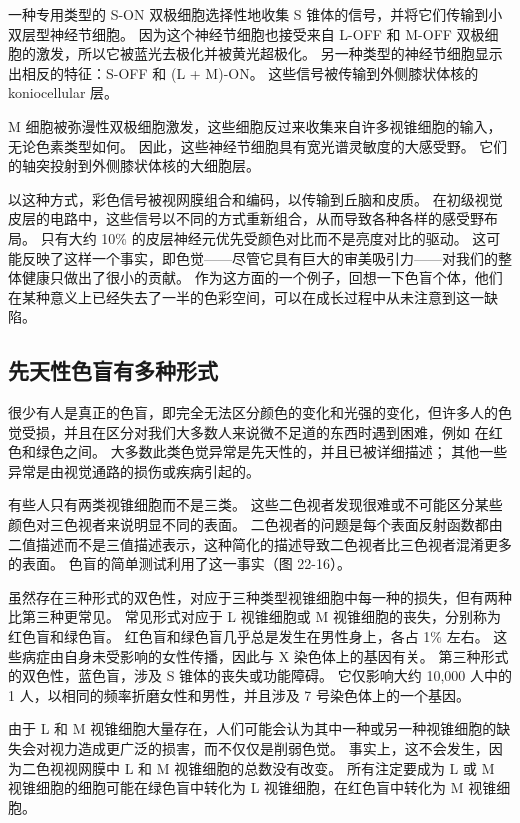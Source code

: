 一种专用类型的 S-ON 双极细胞选择性地收集 S 锥体的信号，并将它们传输到小双层型神经节细胞。 因为这个神经节细胞也接受来自 L-OFF 和 M-OFF 双极细胞的激发，所以它被蓝光去极化并被黄光超极化。 另一种类型的神经节细胞显示出相反的特征：S-OFF 和 (L + M)-ON。 这些信号被传输到外侧膝状体核的 koniocellular 层。

M 细胞被弥漫性双极细胞激发，这些细胞反过来收集来自许多视锥细胞的输入，无论色素类型如何。 因此，这些神经节细胞具有宽光谱灵敏度的大感受野。 它们的轴突投射到外侧膝状体核的大细胞层。

以这种方式，彩色信号被视网膜组合和编码，以传输到丘脑和皮质。 在初级视觉皮层的电路中，这些信号以不同的方式重新组合，从而导致各种各样的感受野布局。 只有大约 10\% 的皮层神经元优先受颜色对比而不是亮度对比的驱动。 这可能反映了这样一个事实，即色觉——尽管它具有巨大的审美吸引力——对我们的整体健康只做出了很小的贡献。 作为这方面的一个例子，回想一下色盲个体，他们在某种意义上已经失去了一半的色彩空间，可以在成长过程中从未注意到这一缺陷。

\subsection{先天性色盲有多种形式}
很少有人是真正的色盲，即完全无法区分颜色的变化和光强的变化，但许多人的色觉受损，并且在区分对我们大多数人来说微不足道的东西时遇到困难，例如 在红色和绿色之间。 大多数此类色觉异常是先天性的，并且已被详细描述； 其他一些异常是由视觉通路的损伤或疾病引起的。

有些人只有两类视锥细胞而不是三类。 这些二色视者发现很难或不可能区分某些颜色对三色视者来说明显不同的表面。 二色视者的问题是每个表面反射函数都由二值描述而不是三值描述表示，这种简化的描述导致二色视者比三色视者混淆更多的表面。 色盲的简单测试利用了这一事实（图 22-16）。

虽然存在三种形式的双色性，对应于三种类型视锥细胞中每一种的损失，但有两种比第三种更常见。 常见形式对应于 L 视锥细胞或 M 视锥细胞的丧失，分别称为红色盲和绿色盲。 红色盲和绿色盲几乎总是发生在男性身上，各占 1\% 左右。 这些病症由自身未受影响的女性传播，因此与 X 染色体上的基因有关。 第三种形式的双色性，蓝色盲，涉及 S 锥体的丧失或功能障碍。 它仅影响大约 10,000 人中的 1 人，以相同的频率折磨女性和男性，并且涉及 7 号染色体上的一个基因。

由于 L 和 M 视锥细胞大量存在，人们可能会认为其中一种或另一种视锥细胞的缺失会对视力造成更广泛的损害，而不仅仅是削弱色觉。 事实上，这不会发生，因为二色视视网膜中 L 和 M 视锥细胞的总数没有改变。 所有注定要成为 L 或 M 视锥细胞的细胞可能在绿色盲中转化为 L 视锥细胞，在红色盲中转化为 M 视锥细胞。


